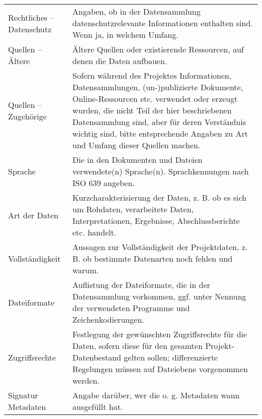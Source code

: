 \begin{center}
\begin{longtable}{L{0.25\textwidth} p{0.68\textwidth}}
		Rechtliches -- Datenschutz & Angaben, ob in der Datensammlung datenschutzrelevante Informationen enthalten sind. Wenn ja, in welchem Umfang.\\
		Quellen -- Ältere & Ältere Quellen oder existierende Ressourcen, auf denen die Daten aufbauen.\\
		Quellen -- Zugehörige & Sofern während des Projektes Informationen, Datensammlungen, (un-)publizierte Dokumente, Online-Ressourcen etc. verwendet oder erzeugt wurden, die nicht Teil der hier beschriebenen Datensammlung sind, aber für deren Verständnis wichtig sind, bitte entsprechende Angaben zu Art und Umfang dieser Quellen machen.\\
		Sprache & Die in den Dokumenten und Dateien verwendete(n) Sprache(n). Sprachkennungen nach ISO 639 angeben.\\
		Art der Daten & Kurzcharakterisierung der Daten, z. B. ob es sich um Rohdaten, verarbeitete Daten, Interpretationen, Ergebnisse, Abschlussberichte etc. handelt.\\
		Vollständigkeit & Aussagen zur Vollständigkeit der Projektdaten, z. B. ob bestimmte Datenarten noch fehlen und warum.\\
		Dateiformate & Auflistung der Dateiformate, die in der Datensammlung vorkommen, ggf. unter Nennung der verwendeten Programme und Zeichenkodierungen.\\
		Zugriffsrechte & Festlegung der gewünschten Zugriffsrechte für die Daten, sofern diese für den gesamten Projekt-Datenbestand gelten sollen; differenzierte Regelungen müssen auf Dateiebene vorgenommen werden.\\
		Signatur Metadaten & Angabe darüber, wer die o. g. Metadaten wann ausgefüllt hat.\\  
	\end{longtable}
\end{center}

